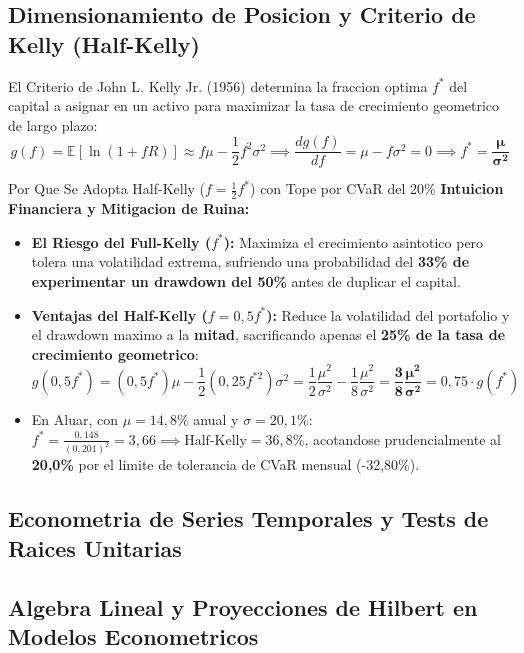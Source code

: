 \documentclass[10pt,a4paper]{article}
\theoremstyle{definition}
\begin{document}
\subsection{Dimensionamiento de Posicion y Criterio de Kelly (Half-Kelly)}
El Criterio de John L. Kelly Jr. (1956) determina la fraccion optima $f^*$ del capital a asignar en un activo para maximizar la tasa de crecimiento geometrico de largo plazo:
\begin{equation}
g(f) = \mathbb{E}[\ln(1 + f R)] \approx f \mu - \frac{1}{2} f^2 \sigma^2 \implies \frac{d g(f)}{d f} = \mu - f \sigma^2 = 0 \implies f^* = \mathbf{\frac{\mu}{\sigma^2}}
\end{equation}
\begin{conceptbox}{Por Que Se Adopta Half-Kelly ($f = \frac{1}{2}f^*$) con Tope por CVaR del 20\%}
\textbf{Intuicion Financiera y Mitigacion de Ruina:}
\begin{itemize}
    \item \textbf{El Riesgo del Full-Kelly ($f^*$):} Maximiza el crecimiento asintotico pero tolera una volatilidad extrema, sufriendo una probabilidad del \textbf{33\% de experimentar un drawdown del 50\%} antes de duplicar el capital.
    \item \textbf{Ventajas del Half-Kelly ($f = 0,5 f^*$):} Reduce la volatilidad del portafolio y el drawdown maximo a la \textbf{mitad}, sacrificando apenas el \textbf{25\% de la tasa de crecimiento geometrico}:
    \begin{equation}
    g(0,5 f^*) = (0,5 f^*) \mu - \frac{1}{2} (0,25 f^{*2}) \sigma^2 = \frac{1}{2} \frac{\mu^2}{\sigma^2} - \frac{1}{8} \frac{\mu^2}{\sigma^2} = \mathbf{\frac{3}{8} \frac{\mu^2}{\sigma^2}} = 0,75 \cdot g(f^*)
    \end{equation}
    \item En Aluar, con $\mu = 14,8\%$ anual y $\sigma = 20,1\%$: $f^* = \frac{0,148}{(0,201)^2} = 3,66 \implies \text{Half-Kelly} = 36,8\%$, acotandose prudencialmente al \textbf{20,0\%} por el limite de tolerancia de CVaR mensual (-32,80\%).
\end{itemize}
\end{conceptbox}

\subsection{Econometria de Series Temporales y Tests de Raices Unitarias}



\subsection{Algebra Lineal y Proyecciones de Hilbert en Modelos Econometricos}
\end{document}
